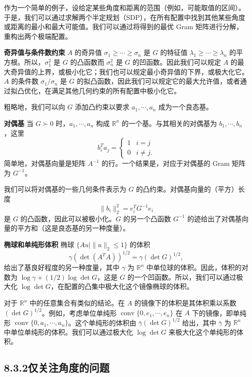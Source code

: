 \documentclass[UTF8,12pt,a4paper,fontset=fandol]{ctexart}
\begin{document}
作为一个简单的例子，设给定某些角度和距离的范围（例如，可能取值的区间）。于是，我们可以通过求解两个半定规划（SDP），在所有配置中找到其他某些角度或距离的最小和最大可能值。我们可以通过将得到的最优 Gram 矩阵进行分解，重构出两个极端配置。

\noindent\textbf{奇异值与条件数约束}\quad
$A$ 的奇异值 $\sigma_1\geq\cdots\geq\sigma_n$ 是 $G$ 的特征值 $\lambda_1\geq\cdots\geq\lambda_n$ 的平方根。所以，$\sigma_1^2$ 是 $G$ 的凸函数而 $\sigma_n^2$ 是 $G$ 的凹函数。因此我们可以规定 $A$ 的最大奇异值的上界，或极小化它；我们也可以规定最小奇异值的下界，或极大化它。$A$ 的条件数 $\sigma_1/\sigma_n$ 是 $G$ 的拟凸函数，因此我们可以规定它的最大允许值，或者通过拟凸优化，在满足其他几何约束的所有配置中极小化它。

粗略地，我们可以向 $G$ 添加凸约束以要求 $a_1,\cdots,a_n$ 成为一个良态基。

\noindent\textbf{对偶基}\quad
当 $G\succ 0$ 时，$a_1,\cdots,a_n$ 构成 $\mathbb{R}^n$ 的一个基。与其相关的对偶基为 $b_1,\cdots,b_n$，这里
\[
b_i^Ta_j=
\begin{cases}
1 & i=j\\
0 & i\neq j.
\end{cases}
\]
简单地，对偶基向量是矩阵 $A^{-1}$ 的行。一个结果是，对应于对偶基的 Gram 矩阵为 $G^{-1}$。

我们可以将对偶基的一些几何条件表示为 $G$ 的凸约束。对偶基向量的（平方）长度
\[
\|b_i\|_2^2=e_i^TG^{-1}e_i
\]
是 $G$ 的凸函数，因此可以被极小化。$G$ 的另一个凸函数 $G^{-1}$ 的迹给出了对偶基向量的平方和（这是良态基的另一种度量）。

\noindent\textbf{椭球和单纯形体积}\quad
椭球 $\{Au\mid \|u\|_2\leq 1\}$ 的体积
\[
\gamma(\det(A^TA))^{1/2}=\gamma(\det G)^{1/2},
\]
给出了基良好程度的另一种度量，其中 $\gamma$ 为 $\mathbb{R}^n$ 中单位球的体积。因此，体积的对数为 $\log\gamma+(1/2)\log\det G$，这是 $G$ 的一个凹函数。所以，我们可以通过极大化 $\log\det G$，在配置的凸集中极大化这个镜像椭球的体积。

对于 $\mathbb{R}^n$ 中的任意集合有类似的结论。在 $A$ 的镜像下的体积是其体积乘以系数 $(\det G)^{1/2}$。例如，考虑单位单纯形 $\operatorname{conv}\{0,e_1,\cdots,e_n\}$ 在 $A$ 下的镜像，即单纯形 $\operatorname{conv}\{0,a_1,\cdots,a_n\}$。这个单纯形的体积由 $\bar{\gamma}(\det G)^{1/2}$ 给出，其中 $\bar{\gamma}$ 为 $\mathbb{R}^n$ 中单位单纯形的体积。我们可以通过极大化 $\log\det G$ 来极大化这个单纯形的体积。

\subsection*{8.3.2\quad 仅关注角度的问题}
\end{document}
